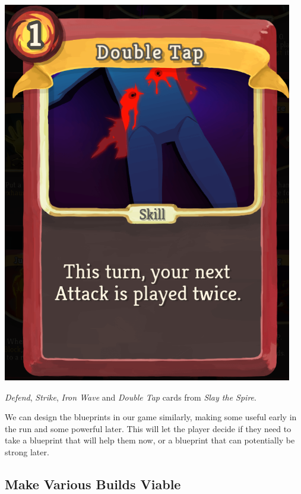 \begin{center}
\begin{minipage}{.25\textwidth}
    \end{minipage}%
    \begin{minipage}{.25\textwidth}
        \centering
        \includegraphics[width=0.95\textwidth]{img/Slay-the-Spire-Double-Tap.png}
    \end{minipage}
    \caption{\emph{Defend}, \emph{Strike}, \emph{Iron Wave} and \emph{Double Tap} cards from \emph{Slay the Spire}.}
    \label{fig:sts-iron-wave-and-double-tap}
\end{center}

We can design the blueprints in our game similarly, making some useful early in the run and some powerful later.
This will let the player decide if they need to take a blueprint that will help them now, or a blueprint that can potentially be strong later.

\subsection{Make Various Builds Viable} \label{sec:goal-various-builds}

